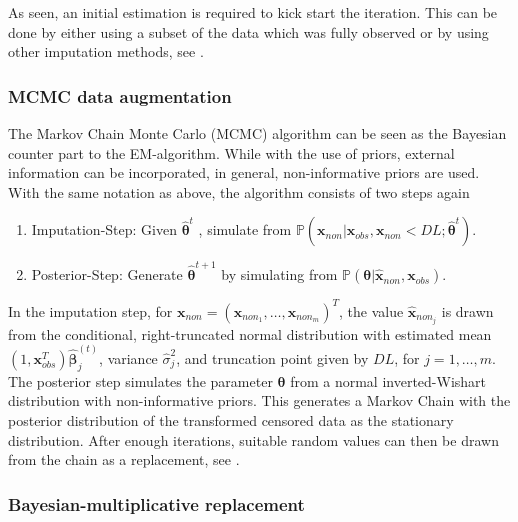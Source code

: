 As seen, an initial estimation is required to kick start the iteration. This can be done by either using a subset of the data which was fully observed or by using other imputation methods, see \textcite{Palarea-Albaladejo:2015}. 


\subsubsection{MCMC data augmentation}
\label{sec:MCMC data augmentation}

The Markov Chain Monte Carlo (MCMC) algorithm can be seen as the Bayesian counter part to the EM-algorithm. While with the use of priors, external information can be incorporated, in general, non-informative priors are used. With the same notation as above, the algorithm consists of two steps again

\begin{enumerate}
	\item Imputation-Step: Given $\hat{\bm{\theta}}^t$ , simulate from $\mathbb{P}(\bm{x}_{non}|\bm{x}_{obs},\bm{x}_{non} < DL; \hat{\bm{\theta}}^t)$.
	\item Posterior-Step: Generate $\hat{\bm{\theta}}^{t+1}$ by simulating from $\mathbb{P}(\bm{\theta}|\hat{\bm{x}}_{non},\bm{x}_{obs})$. 
\end{enumerate}
%
In the imputation step, for $\bm{x}_{non}=(\bm{x}_{{non}_1},\ldots,\bm{x}_{{non}_{m}})^T$, the value $\hat{\bm{x}}_{{non}_j}$ is drawn from the conditional, right-truncated normal distribution with estimated mean $(1,\bm{x}_{obs}^T)\hat{\bm{\beta}}_{j}^{(t)}$, variance $\hat{\sigma}_j^2$, and truncation point given by $DL$, for $j=1,\ldots,m$. The posterior step simulates the parameter $\bm{\theta}$ from a normal inverted-Wishart distribution with non-informative
priors. This generates a Markov Chain with the posterior distribution of the transformed censored data as the stationary distribution. After enough iterations, suitable random values can then be drawn from the chain as a replacement, see \textcite{Palarea-Albaladejo:2015}. %


\subsubsection{Bayesian-multiplicative replacement}
\label{sec:Bayesian-multiplicative replacement}


